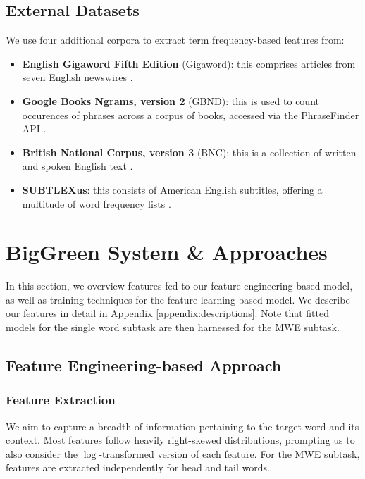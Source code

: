 \documentclass[11pt,a4paper]{article}
\begin{document}
\subsection{External Datasets}

We use four additional corpora to extract term frequency-based features from:

\begin{itemize}
  \item \noindent \textbf{English Gigaword Fifth Edition} (Gigaword): this comprises articles from seven English newswires \citep{parker2011english}.
  \item \noindent \textbf{Google Books Ngrams, version 2} (GBND): this is used to count occurences of phrases across a corpus of books, accessed via the PhraseFinder API \citep{phrasefinder}.
  \item \noindent \textbf{British National Corpus, version 3} (BNC): this is a collection of written and spoken English text \citep{bnc2007british}.
  \item \noindent \textbf{SUBTLEXus}: this consists of American English subtitles, offering a multitude of word frequency lists \citep{brysbaert2009moving}.
\end{itemize}

\section{BigGreen System \& Approaches}

In this section, we overview features fed to our feature engineering-based model, as well as training techniques for the feature learning-based model. We describe our features in detail in Appendix \ref{appendix:descriptions}. Note that fitted models for the single word subtask are then harnessed for the MWE subtask.

\subsection{Feature Engineering-based Approach}

\subsubsection{Feature Extraction}

We aim to capture a breadth of information pertaining to the target word and its context. Most features follow heavily right-skewed distributions, prompting us to also consider the $\log$-transformed version of each feature. For the MWE subtask, features are extracted independently for head and tail words. 
\end{document}

